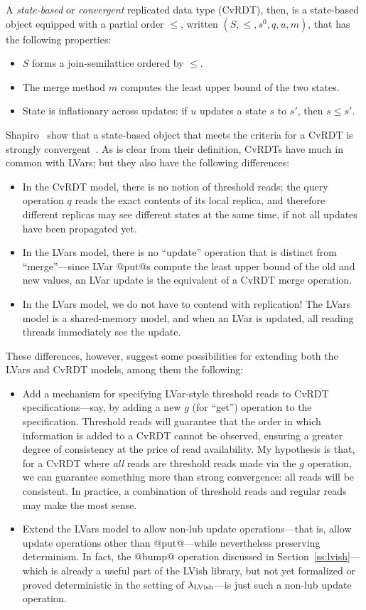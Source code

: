 \documentclass{article}
\begin{document}
A \emph{state-based} or \emph{convergent} replicated data type
(CvRDT), then, is a state-based object equipped with a partial order
$\leq$, written $(S, \leq, s^0, q, u, m)$, that has the following
properties:
\begin{itemize}
\item $S$ forms a join-semilattice ordered by $\leq$.
\item The merge method $m$ computes the least upper bound of the two
  states.
\item State is inflationary across updates: if $u$ updates a state $s$
  to $s'$, then $s \leq s'$.
\end{itemize}
Shapiro \etal~show that a state-based object that meets the criteria
for a CvRDT is strongly convergent~\cite{crdts}.  As is clear from
their definition, CvRDTs have much in common with LVars; but they also
have the following differences:
\begin{itemize}
\item In the CvRDT model, there is no notion of threshold reads; the
  query operation $q$ reads the exact contents of its local replica,
  and therefore different replicas may see different states at the
  same time, if not all updates have been propagated yet.
\item In the LVars model, there is no ``update'' operation that is
  distinct from ``merge''---since LVar @put@s compute the least upper
  bound of the old and new values, an LVar update is the equivalent of
  a CvRDT merge operation.
\item In the LVars model, we do not have to contend with replication!
  The LVars model is a shared-memory model, and when an LVar is
  updated, all reading threads immediately see the update.
\end{itemize}
These differences, however, suggest some possibilities for extending
both the LVars and CvRDT models, among them the following:
\begin{itemize}
\item Add a mechanism for specifying LVar-style threshold reads to
  CvRDT specifications---say, by adding a new $g$ (for ``get'')
  operation to the specification.  Threshold reads will guarantee that
  the order in which information is added to a CvRDT cannot be
  observed, ensuring a greater degree of consistency at the price of
  read availability.  My hypothesis is that, for a CvRDT where
  \emph{all} reads are threshold reads made via the $g$ operation, we
  can guarantee something more than strong convergence: all reads will
  be consistent.  In practice, a combination of threshold reads and
  regular reads may make the most sense.
\item Extend the LVars model to allow non-lub update operations---that
  is, allow update operations other than @put@---while nevertheless
  preserving determinism.  In fact, the @bump@ operation discussed in
  Section~\ref{ss:lvish}---which is already a useful part of the LVish
  library, but not yet formalized or proved deterministic in the
  setting of $\lambda_{\textrm{LVish}}$---is just such a non-lub update operation.
\end{itemize}
\end{document}
